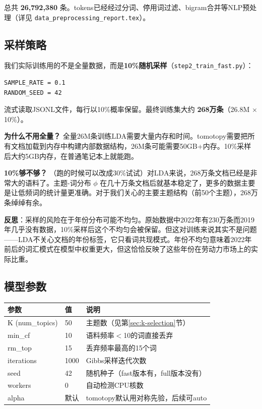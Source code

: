 \documentclass[12pt,a4paper]{ctexart}
\begin{document}
总共 \textbf{26,792,380} 条。tokens已经经过分词、停用词过滤、bigram合并等NLP预处理（详见 \texttt{data\_preprocessing\_report.tex}）。

\subsection{采样策略}

我们实际训练用的不是全量数据，而是\textbf{10\%随机采样}（\texttt{step2\_train\_fast.py}）：

\begin{verbatim}
SAMPLE_RATE = 0.1
RANDOM_SEED = 42
\end{verbatim}

流式读取JSONL文件，每行以10\%概率保留。最终训练集大约 \textbf{268万条}（26.8M $\times$ 10\%）。

\textbf{为什么不用全量？} 全量26M条训练LDA需要大量内存和时间。tomotopy需要把所有文档加载到内存中构建内部数据结构，26M条可能需要50GB+内存。10\%采样后大约5GB内存，在普通笔记本上就能跑。

\textbf{10\%够不够？} （跑的时候可以改成30\%试试）对LDA来说，268万条文档已经是非常大的语料了。主题-词分布 $\phi$ 在几十万条文档后就基本稳定了，更多的数据主要是让低频词的统计量更准确。对于我们关心的主要主题结构（前50个主题），268万条绰绰有余。

\textbf{反思}：采样的风险在于年份分布可能不均匀。原始数据中2022年有230万条而2019年几乎没有数据，10\%采样后这个不均匀会被保留。但这对训练来说其实不是问题——LDA不关心文档的年份标签，它只看词共现模式。年份不均匀意味着2022年前后的词汇模式在模型中权重更大，但这恰恰反映了这些年份在劳动力市场上的实际比重。

\subsection{模型参数}

\begin{table}[h]
\centering
\begin{tabular}{lll}
\toprule
\textbf{参数} & \textbf{值} & \textbf{说明} \\
\midrule
K (num\_topics) & 50 & 主题数（见第\ref{sec:k-selection}节） \\
min\_cf & 10 & 语料频率$<$10的词直接丢弃 \\
rm\_top & 15 & 丢弃频率最高的15个词 \\
iterations & 1000 & Gibbs采样迭代次数 \\
seed & 42 & 随机种子（fast版本有，full版本没有） \\
workers & 0 & 自动检测CPU核数 \\
alpha & 默认 & tomotopy默认用对称先验，后续可auto \\
\bottomrule
\end{tabular}
\end{table}
\end{document}

